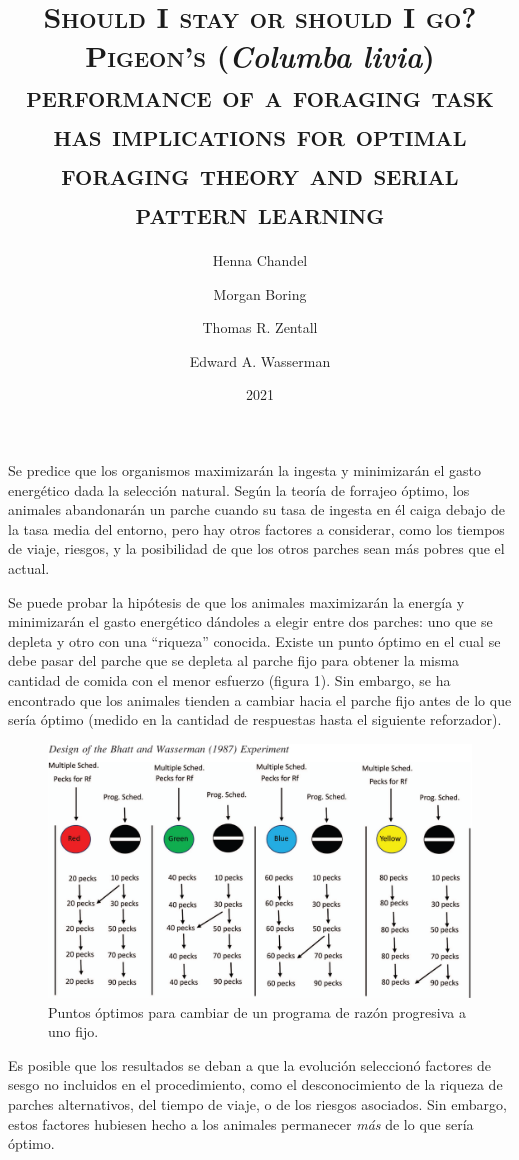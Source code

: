 \documentclass[a4paper,12pt]{article}
\title{{\scshape\bfseries Should I stay or should I go? Pigeon's} ({\itshape\bfseries Columba livia}) {\scshape\bfseries performance of a foraging task has implications for optimal foraging theory and serial pattern learning}}
\author{Henna Chandel \and Morgan Boring \and Thomas R. Zentall \and Edward A. Wasserman}
\date{2021}
\begin{document}
{\maketitle}

Se predice que los organismos maximizarán la ingesta y minimizarán el gasto energético dada la selección natural. Según la teoría de forrajeo óptimo, los animales abandonarán un parche cuando su tasa de ingesta en él caiga debajo de la tasa media del entorno, pero hay otros factores a considerar, como los tiempos de viaje, riesgos, y la posibilidad de que los otros parches sean más pobres que el actual. 

Se puede probar la hipótesis de que los animales maximizarán la energía y minimizarán el gasto energético dándoles a elegir entre dos parches: uno que se depleta y otro con una ``riqueza'' conocida. Existe un punto óptimo en el cual se debe pasar del parche que se depleta al parche fijo para obtener la misma cantidad de comida con el menor esfuerzo (figura 1). Sin embargo, se ha encontrado que los animales tienden a cambiar hacia el parche fijo antes de lo que sería óptimo (medido en la cantidad de respuestas hasta el siguiente reforzador).
\begin{figure}[ht]
	\begin{center}
		\includegraphics[scale=0.5]{Chandel2021(1).png}
		\caption{Puntos óptimos para cambiar de un programa de razón progresiva a uno fijo.}
	\end{center}
\end{figure}

Es posible que los resultados se deban a que la evolución seleccionó factores de sesgo no incluidos en el procedimiento, como el desconocimiento de la riqueza de parches alternativos, del tiempo de viaje, o de los riesgos asociados. Sin embargo, estos factores hubiesen hecho a los animales permanecer {\itshape más} de lo que sería óptimo.
\end{document}
